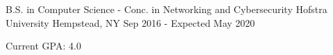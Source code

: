 

\begin{cventries}

  \cventry
    {B.S. in Computer Science - Conc. in Networking and Cybersecurity} %
    {Hofstra University} %
    {Hempstead, NY} %
    {Sep 2016 - Expected May 2020} %
    {
      \begin{cvitems} %
        \item {Current GPA: 4.0} 
      \end{cvitems}
    }

%
\end{cventries}
